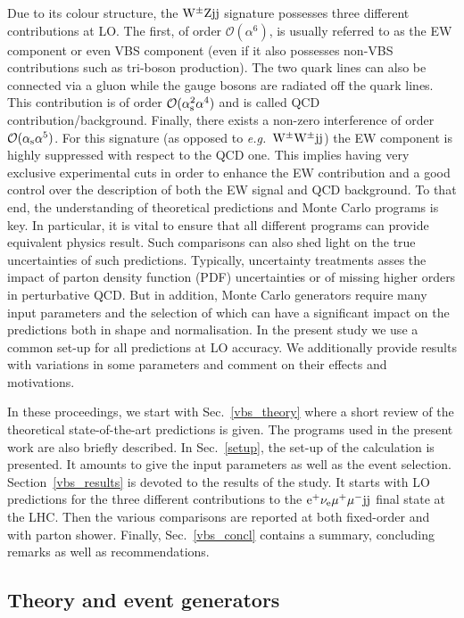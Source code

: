 \documentclass[11pt]{cernrep}
\begin{document}
Due to its colour structure, the ${\rm W}^{\pm}{\rm Z}{\rm j}{\rm j}$ signature possesses three different contributions at LO.
The first, of order $\mathcal{O} (\alpha^6)$, is usually referred to as the EW component or even VBS component (even if it also possesses non-VBS contributions such as tri-boson production).
The two quark lines can also be connected via a gluon while the gauge bosons are radiated off the quark lines.
This contribution is of order $\mathcal{O} (\alpha_{\rm s}^2\alpha^4)$ and is called QCD contribution/background.
Finally, there exists a non-zero interference of order $\mathcal{O} (\alpha_{\rm s}\alpha^5)$.
For this signature (as opposed to \emph{e.g.}\ ${\rm W}^\pm{\rm W}^\pm{\rm j}{\rm j}$) the EW component is highly suppressed with respect to the QCD one.
This implies having very exclusive experimental cuts in order to enhance the EW contribution and a good control over the description of both the EW signal and QCD background.
To that end, the understanding of theoretical predictions and Monte Carlo programs is key.
In particular, it is vital to ensure that all different programs can provide equivalent physics result.
Such comparisons can also shed light on the true uncertainties of such predictions.
Typically, uncertainty treatments asses the impact of parton density function (PDF) uncertainties or of missing higher orders in perturbative QCD.
But in addition, Monte Carlo generators require many input parameters and the selection of which can have a significant impact on the predictions both in shape and normalisation.
In the present study we use a common set-up for all predictions at LO accuracy. We additionally provide results with
variations in some parameters and comment on their effects and motivations.

In these proceedings, we start with Sec.~\ref{vbs_theory} where a short review of the theoretical state-of-the-art predictions is given.
The programs used in the present work are also briefly described.
In Sec.~\ref{setup}, the set-up of the calculation is presented.
It amounts to give the input parameters as well as the event selection.
Section~\ref{vbs_results} is devoted to the results of the study.
It starts with LO predictions for the three different contributions to the ${\rm e}^+  \nu_{\rm e}  \mu^+ \mu^- {\rm j} {\rm j}$ final state at the LHC.
Then the various comparisons are reported at both fixed-order and with parton shower.
Finally, Sec.~\ref{vbs_concl} contains a summary, concluding remarks as well as recommendations.

\subsection{Theory and event generators \label{vbs_theory}}
\end{document}
